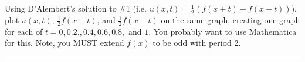 \documentclass[10pt]{article}
\begin{document}
\section{\underline{}}
\label{sec: Problem 3}

\noindent
Using D'Alembert's solution to \#1 (i.e. $ u(x,t) = \frac{1}{2}(f(x + t) + f(x - t)) $), plot $ u(x,t) $, $ \frac{1}{2}f(x + t) $, 
and $ \frac{1}{2}f(x - t) $ on the same graph, creating one graph  for each of $ t = 0, 0.2., 0.4, 0.6, 0.8, $ and $ 1. $ 
You probably want to use Mathematica for this. Note, you MUST extend $f (x) $ to be odd with period 2. \\
\vspace{2.5mm}

\hrule 

\vspace{7.5mm}
\end{document}
